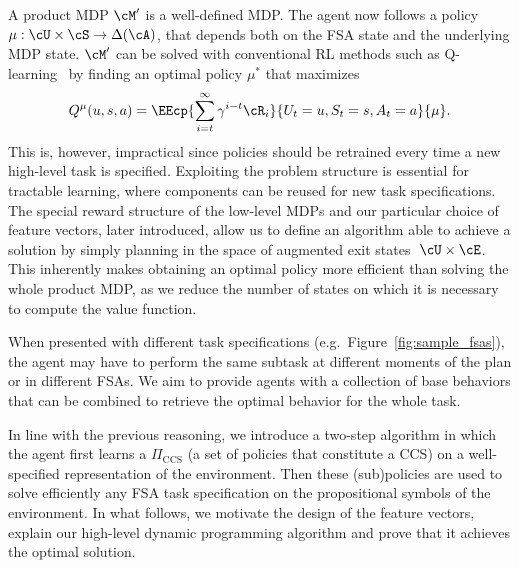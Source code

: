 A product MDP $\cM'$ is a well-defined MDP. The agent now follows a policy $\mu:\cU\times\cS\rightarrow\Delta(\cA)$, that depends both on the FSA state and the underlying MDP state. $\cM'$ can be solved with conventional RL methods such as Q-learning~\cite{Watkins1992} by finding an optimal policy $\mu^*$ that maximizes
\begin{equation*}
Q^\mu(u, s, a) = \EEcp{\sum_{i=t}^\infty \gamma^{i-t}\cR_i}{U_t= u, S_t=s, A_t=a}{\mu}.
\end{equation*}
This is, however, impractical since policies should be retrained every time a new high-level task is specified. Exploiting the problem structure is essential for tractable learning, where components can be reused for new task specifications. The special reward structure of the low-level MDPs and our particular choice of feature vectors, later introduced, allow us to define an algorithm able to achieve a solution by simply planning in the space of augmented exit states $\;\cU\times\cE$. This inherently makes obtaining an optimal policy more efficient than solving the whole product MDP, as we reduce the number of states on which it is necessary to compute the value function.

 When presented with different task specifications (e.g.~Figure~\ref{fig:sample_fsas}), the agent may have to perform the same subtask at different moments of the plan or in different FSAs. We aim to provide agents with a collection of base behaviors that can be combined to retrieve the optimal behavior for the whole task.

In line with the previous reasoning, we introduce a two-step algorithm in which the agent first learns a $\Pi_{\text{CCS}}$ (a set of policies that constitute a CCS) on a well-specified representation of the environment. Then these (sub)policies are used to solve efficiently any FSA task specification on the propositional symbols of the environment. In what follows, we motivate the design of the feature vectors, explain our high-level dynamic programming algorithm and prove that it achieves the optimal solution.

